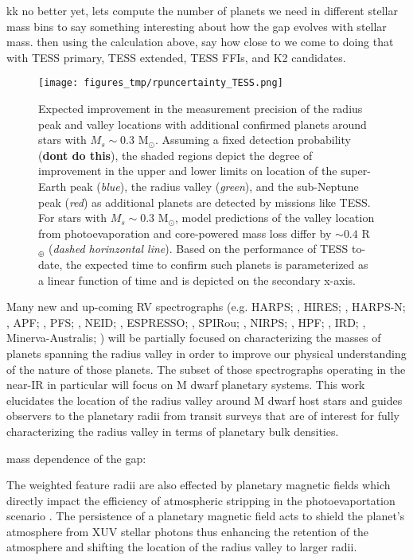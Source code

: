 \documentclass[twocolumn]{emulateapj}
\begin{document}
kk no better yet, lets compute the number of planets we need in different stellar mass bins to say something interesting about how the gap evolves 
with stellar mass. then using the calculation above, say how close to we come to doing that with TESS primary, TESS extended, TESS FFIs, and K2 
candidates.

\begin{figure}
  \centering
  \texttt{[image: figures\_tmp/rpuncertainty\_TESS.png]}
  \caption{Expected improvement in the measurement precision of the radius peak and valley locations with additional
    confirmed planets around stars with $M_s\sim 0.3$ M$_{\odot}$. Assuming a fixed detection probability (\textbf{dont do this}),
    the shaded
    regions depict the degree of improvement in the upper and lower limits on location of the super-Earth peak
    (\emph{blue}), the radius valley (\emph{green}), and the sub-Neptune peak (\emph{red}) as additional planets are
    detected by missions like TESS. For stars with $M_s\sim 0.3$ M$_{\odot}$, model predictions of the valley location
    from photoevaporation and core-powered mass loss differ by $\sim 0.4$ R$_{\oplus}$ (\emph{dashed horinzontal line}).
    Based on the performance of TESS to-date, the expected time to confirm such planets is parameterized as a linear
    function of time and is depicted on the secondary x-axis.}
  \label{fig:improve}
\end{figure}

Many new and up-coming RV spectrographs (e.g. HARPS; \citealt{mayor03}, HIRES; \citealt{}, 
HARPS-N; \citealt{}, APF; \citealt{}, PFS; \citealt{}, NEID; \citealt{},
ESPRESSO; \citealt{}, SPIRou; \citealt{}, NIRPS; \citealt{},  HPF; \citealt{}, IRD; \citealt{},
Minerva-Australis; \citealt{})
will be partially focused on characterizing the masses of planets spanning the radius valley in order to
improve our physical understanding of the nature of those planets. The subset of those spectrographs operating
in the near-IR in particular will focus on M dwarf planetary systems. This work elucidates the location of
the radius valley around M dwarf host stars and guides observers to the planetary radii from transit surveys
that are of interest for fully characterizing the radius valley in terms of planetary bulk densities.

mass dependence of the gap: 

The weighted feature radii are also effected by planetary magnetic fields which directly impact the 
efficiency of atmospheric stripping in the photoevaportation scenario \citep{owen19}. The persistence 
of a planetary magnetic field acts to shield the planet's atmosphere from XUV stellar photons thus 
enhancing the retention of the atmosphere and shifting the location of the radius valley to larger 
radii.
\end{document}
